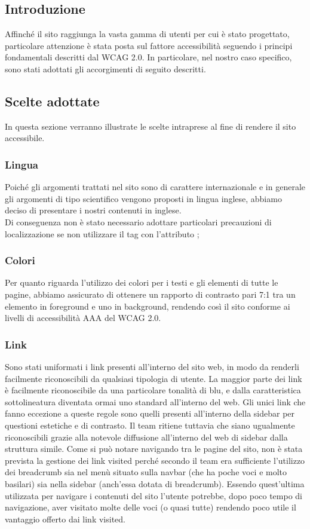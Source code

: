 \documentclass[12pt]{article}
\begin{document}
	\subsection{Introduzione}
	Affinché il sito raggiunga la vasta gamma di utenti per cui è stato progettato, particolare attenzione è stata posta sul fattore accessibilità seguendo i principi fondamentali descritti dal WCAG 2.0. In particolare, nel nostro caso specifico, sono stati adottati gli accorgimenti di seguito descritti.
	\subsection{Scelte adottate}
	In questa sezione verranno illustrate le scelte intraprese al fine di rendere il sito accessibile.
	
	\subsubsection{Lingua}
	Poiché gli argomenti trattati nel sito sono di carattere internazionale e in generale gli argomenti di tipo scientifico vengono proposti in lingua inglese, abbiamo deciso di presentare i nostri contenuti in inglese. \\
	Di conseguenza non è stato necessario adottare particolari precauzioni di localizzazione se non utilizzare il tag  con l'attributo ;
	\subsubsection{Colori}
	Per quanto riguarda l'utilizzo dei colori per i testi e gli elementi di tutte le pagine, abbiamo assicurato di ottenere un rapporto di contrasto pari 7:1 tra un elemento in foreground e uno in background, rendendo così il sito conforme ai livelli di accessibilità AAA del WCAG 2.0. 
	\subsubsection{Link}
	Sono stati uniformati i link presenti all'interno del sito web, in modo da renderli facilmente riconoscibili da qualsiasi tipologia di utente. La maggior parte dei link è facilmente riconoscibile da una particolare tonalità di blu, e dalla caratteristica sottolineatura diventata ormai uno standard all'interno del web. Gli unici link che fanno eccezione a queste regole sono quelli presenti all'interno della sidebar per questioni estetiche e di contrasto. Il team ritiene tuttavia che siano ugualmente riconoscibili grazie alla notevole diffusione all'interno del web di sidebar dalla struttura simile.
	Come si può notare navigando tra le pagine del sito, non è stata prevista la gestione dei link visited perché secondo il team era sufficiente l'utilizzo dei breadcrumb sia nel menù situato sulla navbar (che ha poche voci e molto basilari) sia nella sidebar (anch'essa dotata di breadcrumb). Essendo quest'ultima utilizzata per navigare i contenuti del sito l'utente potrebbe, dopo poco tempo di navigazione, aver visitato molte delle voci (o quasi tutte) rendendo poco utile il vantaggio offerto dai link visited.
	\newpage
\end{document}
